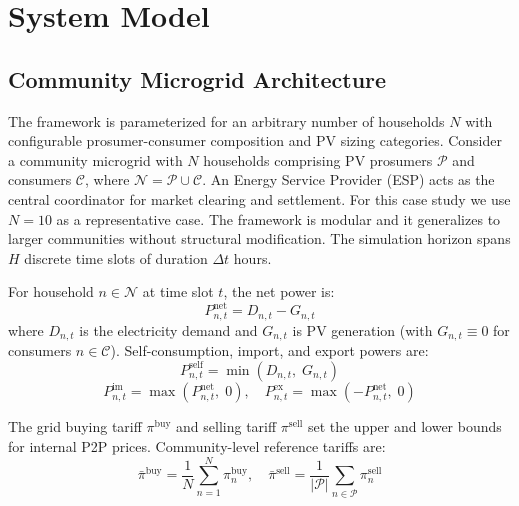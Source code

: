 \documentclass[conference]{IEEEtran}
\begin{document}
\section{System Model}

\subsection{Community Microgrid Architecture}

The framework is parameterized for an arbitrary number of households $N$ with configurable prosumer-consumer composition and PV sizing categories. Consider a community microgrid with $N$ households comprising PV prosumers $\mathcal{P}$ and consumers $\mathcal{C}$, where $\mathcal{N} = \mathcal{P} \cup \mathcal{C}$. An Energy Service Provider (ESP) acts as the central coordinator for market clearing and settlement. For this case study we use $N = 10$ as a representative case. The framework is modular and it generalizes to larger communities without structural modification. The simulation horizon spans $H$ discrete time slots of duration $\Delta t$ hours.

For household $n \in \mathcal{N}$ at time slot $t$, the net power is:
\begin{equation}
    P_{n,t}^{\text{net}} = D_{n,t} - G_{n,t}
    \label{eq:net_power}
\end{equation}
where $D_{n,t}$ is the electricity demand and $G_{n,t}$ is PV generation (with $G_{n,t} \equiv 0$ for consumers $n \in \mathcal{C}$). Self-consumption, import, and export powers are:
\begin{equation}
    P_{n,t}^{\text{self}} = \min(D_{n,t},\; G_{n,t})
    \label{eq:self_consumption}
\end{equation}
\begin{equation}
    P_{n,t}^{\text{im}} = \max(P_{n,t}^{\text{net}},\; 0), \quad P_{n,t}^{\text{ex}} = \max(-P_{n,t}^{\text{net}},\; 0)
    \label{eq:import_export}
\end{equation}

The grid buying tariff $\pi^{\text{buy}}$ and selling tariff $\pi^{\text{sell}}$ set the upper and lower bounds for internal P2P prices. Community-level reference tariffs are:
\begin{equation}
    \bar{\pi}^{\text{buy}} = \frac{1}{N}\sum_{n=1}^{N}\pi_n^{\text{buy}}, \quad \bar{\pi}^{\text{sell}} = \frac{1}{|\mathcal{P}|}\sum_{n \in \mathcal{P}}\pi_n^{\text{sell}}
    \label{eq:ref_tariffs}
\end{equation}
\end{document}
